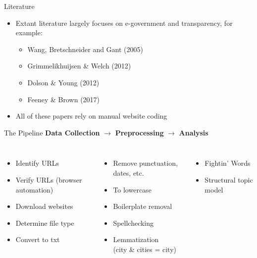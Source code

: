 \documentclass[12pt]{beamer}
\begin{document}
\begin{frame}{Literature}
\linespread{1.5}
{\large
	\begin{itemize}
		\item Extant literature largely focuses on e-government and transparency, for example:
		\begin{itemize}
			\item Wang, Bretschneider and Gant (2005)
			\item Grimmelikhuijsen \& Welch (2012)
			\item Dolson \& Young (2012)
			\item Feeney \& Brown (2017)
		\end{itemize}
		\item All of these papers rely on manual website coding
	\end{itemize}
	
}
\end{frame}

\begin{frame}{The Pipeline}
	\textbf{Data Collection} \hspace{2mm} $\rightarrow$ \hspace{2mm} \textbf{Preprocessing} \hspace{2mm} $\rightarrow$ \hspace{2mm} \textbf{Analysis}
\begin{columns}
	\vspace{5mm}
	\begin{itemize}
		\item Identify URLs
		\item Verify URLs (browser automation)
		\item Download websites
		\item Determine file type
		\item Convert to txt
	\end{itemize}		
	\vspace{5mm}
	\begin{itemize}
		\item Remove punctuation, dates, etc.
		\item To lowercase
		\item Boilerplate removal
		\item Spellchecking
		\item Lemmatization \\ (city \& cities = city)
	\end{itemize}
	\vspace{5mm}
	\begin{itemize}
		\item Fightin' Words
		\item Structural topic model
	\end{itemize}
\end{columns}
\end{frame}
\end{document}
